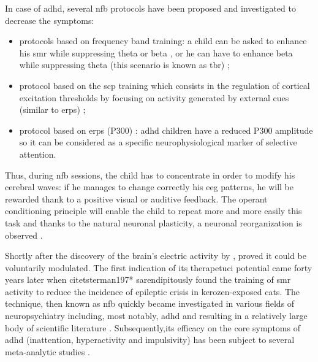 In case of \gls{adhd}, several \gls{nfb} protocols have been proposed and investigated to decrease the symptoms: 
\begin{itemize}
	\item protocols based on frequency band training: a child can be asked to enhance his \gls{smr} 
	while suppressing theta or beta \citep{Lubar1976}, or he can have to enhance beta
	while suppressing theta (this scenario is known as \gls{tbr}) \citep{Arns2013};
	\item protocol based on the \gls{scp} training which consists in the regulation of cortical excitation 
	thresholds by focusing on activity generated by external cues 
	(similar to \gls{erps}) \citep{Heinrich2004, Banaschewski2007}; 
	\item protocol based on \gls{erps} (P300) \citep{Fouillen2017}: \gls{adhd} children have a reduced P300 
	amplitude so it can be considered as a specific neurophysiological marker 
	of selective attention. 
\end{itemize} 

Thus, during \gls{nfb} sessions, the child has to concentrate in order to modify his cerebral waves: 
if he manages to change correctly his \gls{eeg} patterns, he will be rewarded thank to 
a positive visual or auditive feedback. The operant conditioning principle will enable the 
child to repeat more and more easily this task and thanks to the natural neuronal plasticity,
 a neuronal reorganization is observed \citep{VanDoren2017}. 

Shortly after the discovery of the brain's electric activity by \citet{Berger1924*}, \citet*{Durrup1935} proved it could be voluntarily modulated. The first indication of its therapetuci potential came forty years later when citet{sterman197*} sarendipitously found the training of \gls{smr} activity to reduce the incidence of epileptic crisis in kerozen-exposed cats. The technique, then known as \gls{nfb} quickly became investigated in various fields of neuropsychiatry including, most notably, \gls{adhd} and resulting in a relatively large body of scientific literature \citep{Lubar1976, Rossiter1995, Linden1996, Maurizio2014}. Subsequently,its efficacy on the core symptoms of \gls{adhd} (inattention, hyperactivity and impulsivity) has been subject to several meta-analytic studies \citep{Loo2005, Lofthouse2012, Arns2009, Micoulaud2014, 
Sonuga-Barke2013}.   

